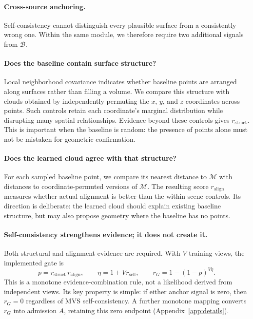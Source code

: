 \documentclass{article}
\newcommand{\rself}{r_{\mathrm{self}}}
\newcommand{\rstruct}{r_{\mathrm{struct}}}
\newcommand{\ralign}{r_{\mathrm{align}}}
\begin{document}
\paragraph{Cross-source anchoring.}
\label{sec:gate}

Self-consistency cannot distinguish every plausible surface from a consistently wrong one. Within the same module, we therefore require two additional signals from $\mathcal B$.

\paragraph{Does the baseline contain surface structure?}
Local neighborhood covariance indicates whether baseline points are arranged along surfaces rather than filling a volume. We compare this structure with clouds obtained by independently permuting the $x$, $y$, and $z$ coordinates across points. Such controls retain each coordinate's marginal distribution while disrupting many spatial relationships. Evidence beyond these controls gives $\rstruct$. This is important when the baseline is random: the presence of points alone must not be mistaken for geometric confirmation.

\paragraph{Does the learned cloud agree with that structure?}
For each sampled baseline point, we compare its nearest distance to $\mathcal M$ with distances to coordinate-permuted versions of $\mathcal M$. The resulting score $\ralign$ measures whether actual alignment is better than the within-scene controls. Its direction is deliberate: the learned cloud should explain existing baseline structure, but may also propose geometry where the baseline has no points.

\paragraph{Self-consistency strengthens evidence; it does not create it.}
Both structural and alignment evidence are required. With $V$ training views, the implemented gate is
\begin{equation}
p=\rstruct\,\ralign,\qquad
\eta=1+V\rself,\qquad
r_G=1-(1-p)^{V\eta}.
\label{eq:gate}
\end{equation}
This is a monotone evidence-combination rule, not a likelihood derived from independent views. Its key property is simple: if either anchor signal is zero, then $r_G=0$ regardless of MVS self-consistency. A further monotone mapping converts $r_G$ into admission $A$, retaining this zero endpoint (Appendix~\ref{app:details}).
\end{document}
